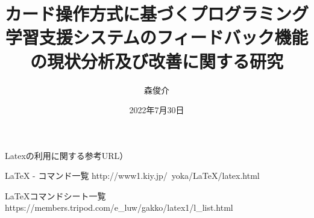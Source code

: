 \documentclass[gaiyou]{hitsotsuron} %
\title{カード操作方式に基づくプログラミング学習支援システムのフィードバック機能の現状分析及び改善に関する研究}
\author{森俊介}
\date{2022年7月30日}
\begin{document}

\twocolumn[%
\maketitle
]


Latexの利用に関する参考URL）

LaTeX - コマンド一覧
http://www1.kiy.jp/~yoka/LaTeX/latex.html

LaTeXコマンドシート一覧
https://members.tripod.com/e_luw/gakko/latex1/l_list.html

\fi











\end{document}
